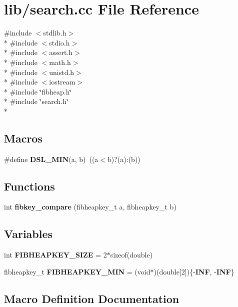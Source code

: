 \section{lib/search.cc File Reference}
\label{lib_2search_8cc}
{\ttfamily \#include $<$stdlib.\-h$>$}\\*
{\ttfamily \#include $<$stdio.\-h$>$}\\*
{\ttfamily \#include $<$assert.\-h$>$}\\*
{\ttfamily \#include $<$math.\-h$>$}\\*
{\ttfamily \#include $<$unistd.\-h$>$}\\*
{\ttfamily \#include $<$iostream$>$}\\*
{\ttfamily \#include \char`\"{}fibheap.\-h\char`\"{}}\\*
{\ttfamily \#include \char`\"{}search.\-h\char`\"{}}\\*
\subsection*{Macros}
\begin{DoxyCompactItemize}
\item 
\#define {\bf D\-S\-L\-\_\-\-M\-I\-N}(a, b)~((a$<$b)?(a)\-:(b))
\end{DoxyCompactItemize}
\subsection*{Functions}
\begin{DoxyCompactItemize}
\item 
int {\bf fibkey\-\_\-compare} (fibheapkey\-\_\-t a, fibheapkey\-\_\-t b)
\end{DoxyCompactItemize}
\subsection*{Variables}
\begin{DoxyCompactItemize}
\item 
int {\bf F\-I\-B\-H\-E\-A\-P\-K\-E\-Y\-\_\-\-S\-I\-Z\-E} = 2$\ast$sizeof(double)
\item 
fibheapkey\-\_\-t {\bf F\-I\-B\-H\-E\-A\-P\-K\-E\-Y\-\_\-\-M\-I\-N} = (void$\ast$)(double[2])\{-\/{\bf I\-N\-F}, -\/{\bf I\-N\-F}\}
\end{DoxyCompactItemize}


\subsection{Macro Definition Documentation}
